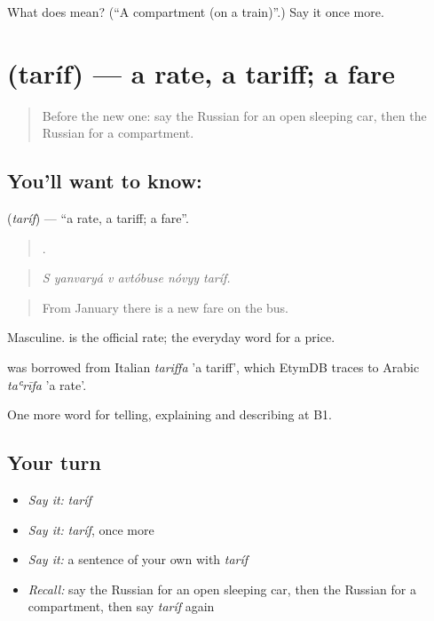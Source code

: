 \begin{tcolorbox}[breakable,colback=teal!4,colframe=teal!35!black,title={Before you move on}]
What does  mean? (\textquotedblleft{}A compartment (on a train)\textquotedblright{}.) Say it once more.
\end{tcolorbox}
\section[\texorpdfstring{\ru{тариф} (taríf)}{тариф (taríf)}]{ (taríf) — a rate, a tariff; a fare}

\label{lesson:RU-C413-tarif}



\begin{quote}
Before the new one: say the Russian for an open sleeping car, then the Russian for a compartment.
\end{quote}

\subsection*{You'll want to know: }
\textbf{} (\emph{taríf}) — \textquotedblleft{}a rate, a tariff; a fare\textquotedblright{}.

\begin{quote}
     .
\end{quote}

\begin{quote}
\emph{S yanvaryá v avtóbuse nóvyy taríf.}
\end{quote}

\begin{quote}
From January there is a new fare on the bus.
\end{quote}

Masculine. \emph{} is the official rate; \emph{} the everyday word for a price.

\begin{cousinweb}
\emph{} was borrowed from Italian \emph{tariffa} 'a tariff', which EtymDB traces to Arabic \emph{taʿrīfa} 'a rate'.
\end{cousinweb}

\begin{grammarlens}[title={What you've built}]
One more word for telling, explaining and describing at B1.
\end{grammarlens}

\subsection*{Your turn}
\begin{itemize}
\raggedright
  \item \emph{Say it:} \emph{taríf}
  \item \emph{Say it:} \emph{taríf}, once more
  \item \emph{Say it:} a sentence of your own with \emph{taríf}
  \item \emph{Recall:} say the Russian for an open sleeping car, then the Russian for a compartment, then say \emph{taríf} again
\end{itemize}

